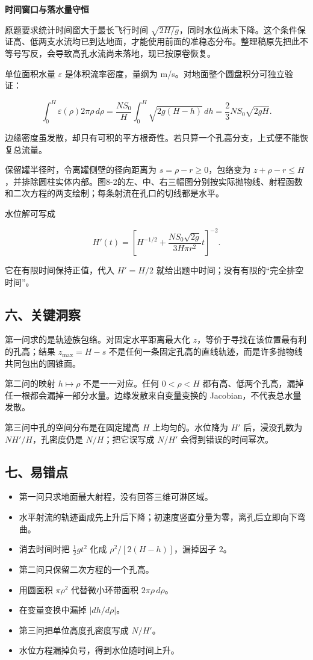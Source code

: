 \documentclass[12pt,a4paper,UTF8]{ctexart}
\newcommand{\tightlist}{\setlength{\itemsep}{0pt}\setlength{\parskip}{0pt}}
\begin{document}
\textbf{时间窗口与落水量守恒}

原题要求统计时间窗大于最长飞行时间
\(\sqrt{2H/g}\)，同时水位尚未下降。这个条件保证高、低两支水流均已到达地面，才能使用前面的准稳态分布。整理稿原先把此不等号写反，会导致高孔水流尚未落地，现已按原卷恢复。

单位面积水量 \(\varepsilon\) 是体积流率密度，量纲为
m/s。对地面整个圆盘积分可独立验证：

\[\int_0^H\varepsilon(\rho)2\pi\rho\,d\rho
=\frac{NS_0}{H}\int_0^H\sqrt{2g(H-h)}\,dh
=\frac23NS_0\sqrt{2gH}.\]

边缘密度虽发散，却只有可积的平方根奇性。若只算一个孔高分支，上式便不能恢复总流量。

保留罐半径时，令离罐侧壁的径向距离为 \(s=\rho-r\ge0\)，包络变为
\(z+\rho-r\le H\)，并排除圆柱实体内部。图8-2的左、中、右三幅图分别按实际抛物线、射程函数和二次方程的两支绘制；每条射流在孔口的切线都是水平。

水位解可写成

\[H'(t)=\left[H^{-1/2}+\frac{NS_0\sqrt{2g}}{3H\pi r^2}t\right]^{-2}.\]

它在有限时间保持正值，代入 \(H'=H/2\)
就给出题中时间；没有有限的``完全排空时间''。

\subsection{六、关键洞察}\label{ux516dux5173ux952eux6d1eux5bdf-7}

第一问求的是轨迹族包络。对固定水平距离最大化
\(z\)，等价于寻找在该位置最有利的孔高；结果 \(z_{\max}=H-s\)
不是任何一条固定孔高的直线轨迹，而是许多抛物线共同包出的圆锥面。

第二问的映射 \(h\mapsto\rho\) 不是一一对应。任何 \(0<\rho<H\)
都有高、低两个孔高，漏掉任一根都会漏掉一部分水量。边缘发散来自变量变换的
Jacobian，不代表总水量发散。

第三问中孔的空间分布是在固定罐高 \(H\) 上均匀的。水位降为 \(H'\)
后，浸没孔数为 \(NH'/H\)，孔密度仍是 \(N/H\)；把它误写成 \(N/H'\)
会得到错误的时间幂次。

\subsection{七、易错点}\label{ux4e03ux6613ux9519ux70b9-7}

\begin{itemize}
\tightlist
\item
  第一问只求地面最大射程，没有回答三维可淋区域。
\item
  水平射流的轨迹画成先上升后下降；初速度竖直分量为零，离孔后立即向下弯曲。
\item
  消去时间时把 \(\tfrac12gt^2\) 化成 \(\rho^2/[2(H-h)]\)，漏掉因子
  \(2\)。
\item
  第二问只保留二次方程的一个孔高。
\item
  用圆面积 \(\pi\rho^2\) 代替微小环带面积 \(2\pi\rho\,d\rho\)。
\item
  在变量变换中漏掉 \(|dh/d\rho|\)。
\item
  第三问把单位高度孔密度写成 \(N/H'\)。
\item
  水位方程漏掉负号，得到水位随时间上升。
\end{itemize}
\end{document}
